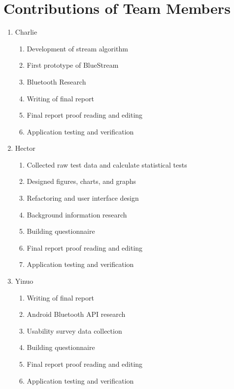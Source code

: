 \documentclass[a4paper,12pt]{article}
\begin{document}
\section{Contributions of Team Members}
\begin{enumerate}[-]
\item Charlie
    \begin{enumerate}
    \item Development of stream algorithm
    \item First prototype of BlueStream
    \item Bluetooth Research
    \item Writing of final report
    \item Final report proof reading and editing
    \item Application testing and verification
    \end{enumerate}
\item Hector
    \begin{enumerate}
    \item Collected raw test data and calculate statistical tests
    \item Designed figures, charts, and graphs
    \item Refactoring and user interface design
    \item Background information research
    \item Building questionnaire
    \item Final report proof reading and editing
    \item Application testing and verification
    \end{enumerate}
\item Yinuo
    \begin{enumerate}
    \item Writing of final report
    \item Android Bluetooth API research
    \item Usability survey data collection
    \item Building questionnaire
    \item Final report proof reading and editing
    \item Application testing and verification
    \end{enumerate}
\end{enumerate}
\end{document}
